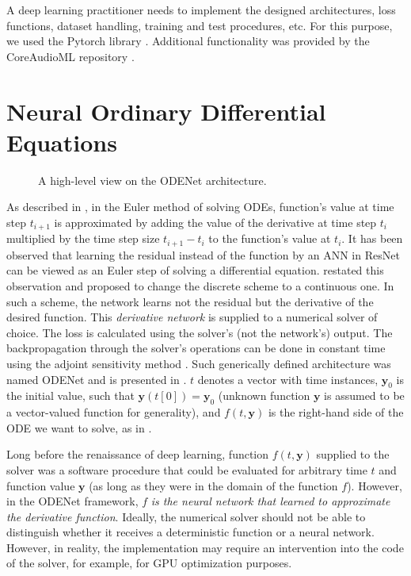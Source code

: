 A deep learning practitioner needs to implement the designed architectures, loss functions, dataset handling, training and test procedures, etc. For this purpose, we used the Pytorch library \cite{Pytorch}. Additional functionality was provided by the CoreAudioML repository \cite{CoreAudioML}.

\section{Neural Ordinary Differential Equations}
\label{sec:neural_odes}

\begin{figure}
    \centering
    
    \caption{A high-level view on the ODENet architecture.}
    \label{fig:odenet_architecture}
\end{figure}

As described in , in the Euler method of solving \acp{ODE}, function's value at time step $t_{i+1}$ is approximated by adding the value of the derivative at time step $t_{i}$ multiplied by the time step size $t_{i+1} - t_i$ to the function's value at $t_i$.
It has been observed that learning the residual instead of the function by an \ac{ANN} in \ac{ResNet} can be viewed as an Euler step of solving a differential equation. \cite{Chen2018} restated this observation
and proposed to change the discrete scheme to a continuous one. In such a scheme, the network learns not the residual but the derivative of the desired function. This \emph{derivative network} is supplied to a numerical solver of choice. The loss is calculated using the solver's (not the network's) output. The backpropagation through the solver's operations can be done in constant time using the adjoint sensitivity method \cite{Chen2018}. Such generically defined architecture was named ODENet and is presented in . $t$ denotes a vector with time instances, $\pmb{y}_0$ is the initial value, such that $\pmb{y}(t[0]) = \pmb{y}_0$ (unknown function $\pmb{y}$ is assumed to be a vector-valued function for generality), and $f(t, \pmb{y})$ is the right-hand side of the \ac{ODE} we want to solve, as in .

Long before the renaissance of deep learning, function $f(t, \pmb{y})$ supplied to the solver was a software procedure that could be evaluated for arbitrary time $t$ and function value $\pmb{y}$ (as long as they were in the domain of the function $f$). However, in the ODENet framework, $f$ \emph{is the neural network that learned to approximate the derivative function}. Ideally, the numerical solver should not be able to distinguish whether it receives a deterministic function or a neural network. However, in reality, the implementation may require an intervention into the code of the solver, for example, for \ac{GPU} optimization purposes.

